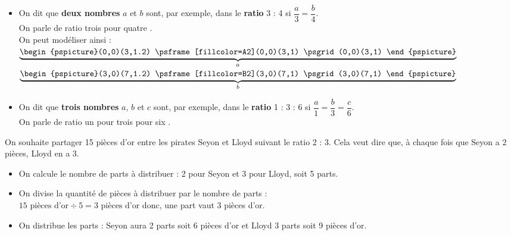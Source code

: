 \begin{definition}[Ratio]
   \begin{itemize}
      \item On dit que {\bf deux nombres} $a$ et $b$ sont, par exemple, dans le {\bf ratio} 3 : 4 si $\dfrac{a}{3} =\dfrac{b}{4}$. \\
      On parle de ratio \og trois pour quatre \fg. \\
      On peut modéliser ainsi : \quad 
      $\underbrace{\begin{pspicture}(0,0)(3,1.2)
                               \psframe[fillcolor=A2](0,0)(3,1)
                               \psgrid(0,0)(3,1)
                            \end{pspicture}}_a$ \!\!\!
     $\underbrace{\begin{pspicture}(3,0)(7,1.2)
                               \psframe[fillcolor=B2](3,0)(7,1)
                               \psgrid(3,0)(7,1)
                            \end{pspicture}}_b$ \\ [-2mm]
      \item On dit que {\bf trois nombres} $a$, $b$ et $c$ sont, par exemple, dans le {\bf ratio} 1 : 3 : 6 si $\dfrac{a}{1} =\dfrac{b}{3} = \dfrac{c}{6}$. \\
      On parle de ratio \og un pour trois pour six \fg. \\ [-8mm]
   \end{itemize}
\end{definition}

\smallskip

\begin{exemple*1}
   On souhaite partager 15 pièces d'or entre les pirates Seyon et Lloyd suivant le ratio 2 : 3. Cela veut dire que, à chaque fois que Seyon a 2 pièces, Lloyd en a 3.
   \begin{itemize}
      \item On calcule le nombre de parts à distribuer : 2 pour Seyon et 3  pour Lloyd, soit 5 parts.
      \item On divise la quantité de pièces à distribuer par le nombre de parts : \\
         $15\text{ pièces d'or}\div 5 =3\text{ pièces d'or}$ donc, une part vaut 3 pièces d'or.
      \item On distribue les parts : Seyon aura 2 parts soit 6 pièces d'or et Lloyd 3 parts soit 9 pièces d'or. \\ [-10mm]
   \end{itemize}
\end{exemple*1}



